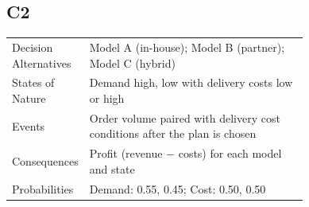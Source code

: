\begin{ExamProblems}
		\subsection*{C2}
		\begin{center}
			\begin{tabular}{l p{0.74\linewidth}}
				\toprule
				Decision Alternatives & Model A (in-house); Model B (partner); Model C (hybrid) \\
				States of Nature & Demand high, low with delivery costs low or high \\
				Events & Order volume paired with delivery cost conditions after the plan is chosen \\
				Consequences & Profit (revenue $-$ costs) for each model and state \\
				Probabilities & Demand: 0.55, 0.45; Cost: 0.50, 0.50 \\
				\bottomrule
			\end{tabular}
		\end{center}
		

\end{ExamProblems}
